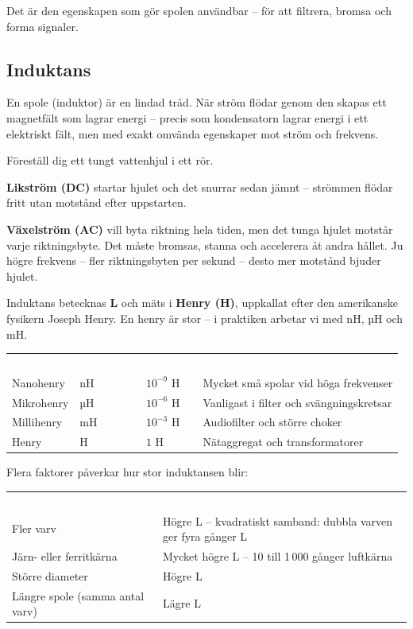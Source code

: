 \documentclass[a4paper,11pt,twoside]{book}
\newcommand{\emoji}[1]{{\emojifont #1}}
\newcommand{\tblhdr}[1]{\cellcolor{greydark}\textcolor{white}{\headingfont\bfseries\footnotesize\MakeUppercase{#1}}}
\begin{document}
Det är den egenskapen som gör spolen användbar -- för att 
filtrera, bromsa och forma signaler.

\subsection{Induktans}

En spole (induktor) är en lindad tråd. När ström flödar 
genom den skapas ett magnetfält som lagrar energi -- 
precis som kondensatorn lagrar energi i ett elektriskt 
fält, men med exakt omvända egenskaper mot ström och 
frekvens.

\begin{examplebox}[title={\emoji{💡} Det tunga vattenhjulet}]
Föreställ dig ett tungt vattenhjul i ett rör.

\textbf{Likström (DC)} startar hjulet och det snurrar 
sedan jämnt -- strömmen flödar fritt utan motstånd 
efter uppstarten.

\textbf{Växelström (AC)} vill byta riktning hela tiden, 
men det tunga hjulet motstår varje riktningsbyte. Det 
måste bromsas, stanna och accelerera åt andra hållet. 
Ju högre frekvens -- fler riktningsbyten per sekund -- 
desto mer motstånd bjuder hjulet.
\end{examplebox}

Induktans betecknas \textbf{L} och mäts i \textbf{Henry 
(H)}, uppkallat efter den amerikanske fysikern Joseph 
Henry. En henry är stor -- i praktiken arbetar vi med 
nH, µH och mH.

\begin{center}
\begin{tabular}{llll}
\rowcolor{greydark}
\tblhdr{Prefix} & \tblhdr{Symbol} & \tblhdr{Värde} & \tblhdr{Används till} \\
Nanohenry & nH & $10^{-9}$ H & Mycket små spolar vid höga frekvenser \\
\rowcolor{greylight}
Mikrohenry & µH & $10^{-6}$ H & Vanligast i filter och svängningskretsar \\
Millihenry & mH & $10^{-3}$ H & Audiofilter och större choker \\
\rowcolor{greylight}
Henry & H & $1$ H & Nätaggregat och transformatorer \\
\end{tabular}
\end{center}

Flera faktorer påverkar hur stor induktansen blir:

\begin{center}
\begin{tabular}{ll}
\rowcolor{greydark}
\tblhdr{Förändring} & \tblhdr{Effekt på L} \\
Fler varv & Högre L -- kvadratiskt samband: dubbla varven ger fyra gånger L \\
\rowcolor{greylight}
Järn- eller ferritkärna & Mycket högre L -- 10 till 1\,000 gånger luftkärna \\
Större diameter & Högre L \\
\rowcolor{greylight}
Längre spole (samma antal varv) & Lägre L \\
\end{tabular}
\end{center}
\end{document}
